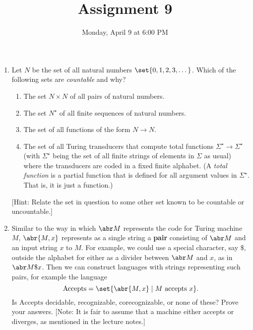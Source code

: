 \documentclass{cs81-homework}
\title{Assignment 9}
\date{Monday, April 9 at 6:00 PM}
\author{}
\begin{document}
\begin{introduction}
  \theintroduction
\end{introduction}

\begin{enumerate}
\item {} Let \(N\) be the set of all natural numbers
  \(\set{0, 1, 2, 3, \dots}\).  Which of the following sets are \emph{countable}
  and why?
  \begin{enumerate}[label=\alph*.]
  \item The set \(N \times N\) of all pairs of natural numbers.
  \item The set \(N^\star\) of all finite sequences of natural numbers.
  \item The set of all functions of the form \(N \to N\).
  \item The set of all Turing transducers that compute total functions
    \(\Sigma^\star \to \Sigma^\star\) (with \(\Sigma^\star\) being the set of
    all finite strings of elements in \(\Sigma\) as usual) where the transducers
    are coded in a fixed finite alphabet.  (A \emph{total function} is a partial
    function that is defined for all argument values in \(\Sigma^\star\).  That
    is, it is just a function.)
  \end{enumerate}
  [Hint: Relate the set in question to some other set known to be countable or
  uncountable.]

  \begin{solution}
  \end{solution}

\item {} Similar to the way in which \(\abr M\) represents the code for
  Turing machine \(M\), \(\abr{M, x}\) represents as a single string a
  \textbf{pair} consisting of \(\abr M\) and an input string \(x\) to \(M\).
  For example, we could use a special character, say \(\$\), outside the
  alphabet for either as a divider between \(\abr M\) and \(x\), as in
  \(\abr M \$ x\).  Then we can construct languages with strings representing
  such pairs, for example the language
  \[
    \mathrm{Accepts} = \set{\abr{M, x} \mid \text{\(M\) accepts \(x\)}}.
  \]
  Is \(\mathrm{Accepts}\) decidable, recognizable, corecognizable, or none of
  these?  Prove your answers.  [Note: It is fair to assume that a machine either
  accepts or diverges, as mentioned in the lecture notes.]

  \begin{solution}
  \end{solution}


\end{enumerate}
\end{document}
